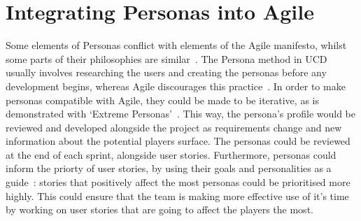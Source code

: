 \documentclass{scrartcl}
\begin{document}
\section{Integrating Personas into Agile}
Some elements of Personas conflict with elements of the Agile manifesto, whilst some parts of their philosophies are similar~\cite{haikara:extending, chaimberlain:framework}. The Persona method in UCD usually involves researching the users and creating the personas before any development begins, whereas Agile discourages this practice~\cite{chaimberlain:framework}. In order to make personas compatible with Agile, they could be made to be iterative, as is demonstrated with `Extreme Personas'~\cite{wolkerstorfer:probing}. This way, the persona's profile would be reviewed and developed alongside the project as requirements change and new information about the potential players surface. The personas could be reviewed at the end of each sprint, alongside user stories. Furthermore, personas could inform the priorty of user stories, by using their goals and personalities as a guide~\cite{microsoft thing}: stories that positively affect the most personas could be prioritised more highly.
This could ensure that the team is making more effective use of it's time by working on user stories that are going to affect the players the most.

\end{document}
